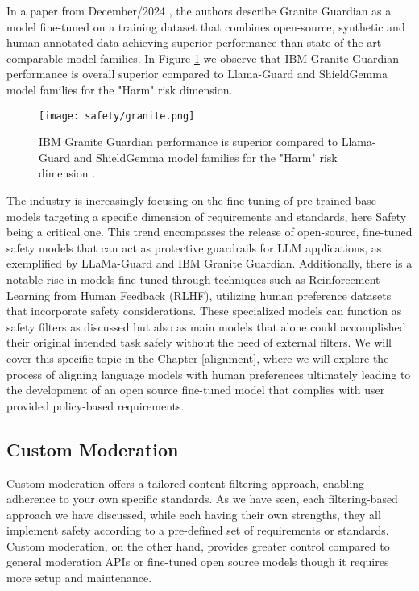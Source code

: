 In a paper from December/2024 , the authors describe Granite Guardian as a model fine-tuned on a training dataset that combines open-source, synthetic and human annotated data achieving superior performance than state-of-the-art comparable model families. In Figure \ref{granite} we observe that IBM Granite Guardian performance is overall superior compared to Llama-Guard and ShieldGemma model families for the "Harm" risk dimension.

\begin{figure}[H]
\centering
\texttt{[image: safety/granite.png]}
\caption{IBM Granite Guardian performance is superior compared to Llama-Guard and ShieldGemma model families for the "Harm" risk dimension \cite{padhi2024graniteguardian}.}
\label{granite}
\end{figure}

The industry is increasingly focusing on the fine-tuning of pre-trained base models targeting a specific dimension of requirements and standards, here Safety being a critical one. This trend encompasses the release of open-source, fine-tuned safety models that can act as protective guardrails for LLM applications, as exemplified by LLaMa-Guard and IBM Granite Guardian. Additionally, there is a notable rise in models fine-tuned through techniques such as Reinforcement Learning from Human Feedback (RLHF), utilizing human preference datasets that incorporate safety considerations. These specialized models can function as safety filters as discussed but also as main models that alone could accomplished their original intended task safely without the need of external filters. We will cover this specific topic in the Chapter \ref{alignment}, where we will explore the process of aligning language models with human preferences ultimately leading to the development of an open source fine-tuned model that complies with user provided policy-based requirements.


\subsection{Custom Moderation}
\label{custom-moderation}

Custom moderation offers a tailored content filtering approach, enabling adherence to your own specific standards. As we have seen, each filtering-based approach we have discussed, while each having their own strengths, they all implement safety according to a pre-defined set of requirements or standards. Custom moderation, on the other hand, provides greater control compared to general moderation APIs or fine-tuned open source models though it requires more setup and maintenance. 

